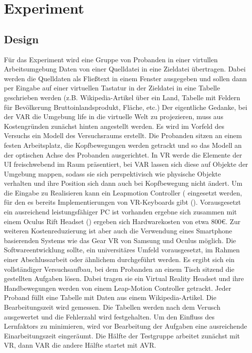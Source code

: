 \documentclass[12pt,a4paper,bibliography=totocnumbered,listof=totocnumbered]{scrartcl}
\begin{document}
\section{Experiment}
\subsection{Design}
Für das Experiment wird eine Gruppe von Probanden in einer virtullen Arbeitsumgebung Daten von einer Quelldatei in eine Zieldatei übertragen. Dabei werden die Quelldaten als Fließtext in einem Fenster ausgegeben und sollen dann per Eingabe auf einer virtuellen Tastatur in der Zieldatei in eine Tabelle geschrieben werden (z.B. Wikipedia-Artikel über ein Land, Tabelle mit Feldern für Bevölkerung Bruttoinlandsprodukt, Fläche, etc.)
Der eigentliche Gedanke, bei der VAR die Umgebung life in die virtuelle Welt zu projezieren, muss aus Kostengründen zunächst hinten angestellt werden. Es wird im Vorfeld des Versuchs ein Modell des Versuchsraums erstellt. Die Probanden sitzen an einem festen Arbeitsplatz, die Kopfbewegungen werden getrackt und so das Modell an der optischen Achse des Probanden ausgerichtet.
In VR werde die Elemente der UI freischwebend im Raum präsentiert, bei VAR lassen sich diese auf Objekte der Umgebung mappen, sodass sie sich perspektivisch wie physische Objekte verhalten und ihre Position sich dann auch bei Kopfbewegung nicht ändert.
Um die Eingabe zu Realisieren kann ein Leapmotion Controller (\cite{leap-motion} eingesetzt werden, für den es bereits Implementierungen von VR-Keyboards gibt (\cite{leap-motion-keyboard}). Vorausgesetzt ein ausreichend leistungsfähiger PC ist vorhanden ergebne sich zusammen mit einem Oculus Rift Headset (\cite{oculus}) ergeben sich Hardwarekosten von etwa 800\euro. Zur weiteren Kostenreduzierung ist aber auch die Verwendung eines Smartphone basierenden Systems wie das Gear VR von Samsung und Oculus möglich. Die Softwareentwicklung sollte, ein universitäres Umfeld vorausgesetzt, im Rahmen einer Abschlussarbeit oder ähnlichem durchgeführt werden.
Es ergibt sich ein vollständiger Versuchsaufbau, bei dem Probanden an einem Tisch sitzend die gestellten Aufgaben lösen. Dabei tragen sie ein Virtual Reality Headset und ihre Handbewegungen werden von einem Leap-Motion Controller getrackt.
Jeder Proband füllt eine Tabelle mit Daten aus einem Wikipedia-Artikel. Die Bearbeitungszeit wird gemessen. Die Tabellen werden nach dem Verusch ausgewertet und die Fehlerzahl wird festgehalten. Um den Einfluss des Lernfaktors zu minimieren, wird vor Bearbeitung der Aufgaben eine ausreichende Einarbeitungszeit eingeräumt. Die Hälfte der Testgruppe arbeitet zunächst mit VR, dann VAR die andere Hälfte startet mit AVR. 
\end{document}
